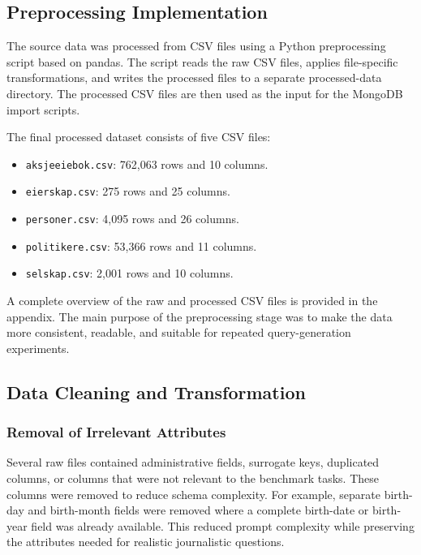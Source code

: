\subsection{Preprocessing Implementation}

The source data was processed from CSV files using a Python preprocessing script based on pandas. The script reads the raw CSV files, applies file-specific transformations, and writes the processed files to a separate processed-data directory. The processed CSV files are then used as the input for the MongoDB import scripts.

The final processed dataset consists of five CSV files:

\begin{itemize}
    \item \texttt{aksjeeiebok.csv}: 762,063 rows and 10 columns.
    \item \texttt{eierskap.csv}: 275 rows and 25 columns.
    \item \texttt{personer.csv}: 4,095 rows and 26 columns.
    \item \texttt{politikere.csv}: 53,366 rows and 11 columns.
    \item \texttt{selskap.csv}: 2,001 rows and 10 columns.
\end{itemize}

A complete overview of the raw and processed CSV files is provided in the appendix. The main purpose of the preprocessing stage was to make the data more consistent, readable, and suitable for repeated query-generation experiments.

\subsection{Data Cleaning and Transformation}

\subsubsection{Removal of Irrelevant Attributes}

Several raw files contained administrative fields, surrogate keys, duplicated columns, or columns that were not relevant to the benchmark tasks. These columns were removed to reduce schema complexity. For example, separate birth-day and birth-month fields were removed where a complete birth-date or birth-year field was already available. This reduced prompt complexity while preserving the attributes needed for realistic journalistic questions.

